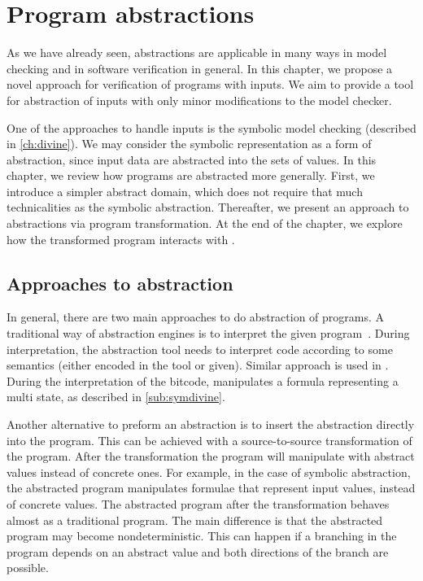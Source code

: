 \chapter{Program abstractions}\label{ch:abstraction}

As we have already seen, abstractions are applicable in many ways in model
checking and in software verification in general. In this chapter, we propose a novel
approach for verification of programs with inputs. We aim to provide a tool for
abstraction of inputs with only minor modifications to the model checker.

One of the approaches to handle inputs is the symbolic model checking (described
in \autoref{ch:divine}). We may consider the symbolic representation as a form
of abstraction, since input data are abstracted into the sets of values. In this
chapter, we review how programs are abstracted more generally. First, we
introduce a simpler abstract domain, which does not require that much
technicalities as the symbolic abstraction. Thereafter, we present an
approach to abstractions via program transformation. At the end of the chapter,
we explore how the transformed program interacts with \DIVINE.

\section{Approaches to abstraction}

In general, there are two main approaches to do abstraction of programs. A
traditional way of abstraction engines is to interpret the given
program~\cite{Cousot79}. During interpretation, the abstraction tool needs to
interpret code according to some semantics (either encoded in the tool or
given). Similar approach is used in \SymDIVINE. During the interpretation of
the \LLVM bitcode, \SymDIVINE manipulates a formula representing a multi state,
as described in \autoref{sub:symdivine}.

Another alternative to preform an abstraction is to insert the abstraction
directly into the program. This can be achieved with a source-to-source
transformation of the program. After the transformation the program will
manipulate with abstract values instead of concrete ones. For example, in the
case of symbolic abstraction, the abstracted program manipulates formulae that
represent input values, instead of concrete values. The abstracted program after
the transformation behaves almost as a traditional program. The main difference
is that the abstracted program may become nondeterministic. This can happen if
a branching in the program depends on an abstract value and both directions of
the branch are possible.

